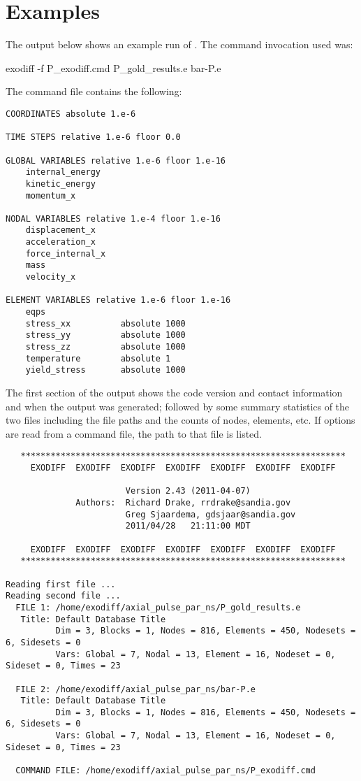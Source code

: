 \section{Examples}
The output below shows an example run of \exodiff{}.  The command
invocation used was:
\begin{syntax}
exodiff -f P_exodiff.cmd P_gold_results.e bar-P.e
\end{syntax}

The  command file contains the following:
\begin{verbatim}
COORDINATES absolute 1.e-6

TIME STEPS relative 1.e-6 floor 0.0 

GLOBAL VARIABLES relative 1.e-6 floor 1.e-16
	internal_energy  
	kinetic_energy   
	momentum_x       

NODAL VARIABLES relative 1.e-4 floor 1.e-16
	displacement_x    
	acceleration_x    
	force_internal_x  
	mass              
	velocity_x        

ELEMENT VARIABLES relative 1.e-6 floor 1.e-16
	eqps              
	stress_xx          absolute 1000 
	stress_yy          absolute 1000 
	stress_zz          absolute 1000 
	temperature        absolute 1    
	yield_stress       absolute 1000 
\end{verbatim}

The first section of the output shows the code version and contact
information and when the output was generated; followed by some
summary statistics of the two files including the file paths and the
counts of nodes, elements, etc.  If options are read from a command
file, the path to that file is listed.

\begin{verbatim}
   *****************************************************************
     EXODIFF  EXODIFF  EXODIFF  EXODIFF  EXODIFF  EXODIFF  EXODIFF  
                                                                    
                        Version 2.43 (2011-04-07)
              Authors:  Richard Drake, rrdrake@sandia.gov           
                        Greg Sjaardema, gdsjaar@sandia.gov          
                        2011/04/28   21:11:00 MDT
                                                                    
     EXODIFF  EXODIFF  EXODIFF  EXODIFF  EXODIFF  EXODIFF  EXODIFF  
   *****************************************************************

Reading first file ... 
Reading second file ... 
  FILE 1: /home/exodiff/axial_pulse_par_ns/P_gold_results.e
   Title: Default Database Title
          Dim = 3, Blocks = 1, Nodes = 816, Elements = 450, Nodesets = 6, Sidesets = 0
          Vars: Global = 7, Nodal = 13, Element = 16, Nodeset = 0, Sideset = 0, Times = 23

  FILE 2: /home/exodiff/axial_pulse_par_ns/bar-P.e
   Title: Default Database Title
          Dim = 3, Blocks = 1, Nodes = 816, Elements = 450, Nodesets = 6, Sidesets = 0
          Vars: Global = 7, Nodal = 13, Element = 16, Nodeset = 0, Sideset = 0, Times = 23

  COMMAND FILE: /home/exodiff/axial_pulse_par_ns/P_exodiff.cmd
\end{verbatim}

